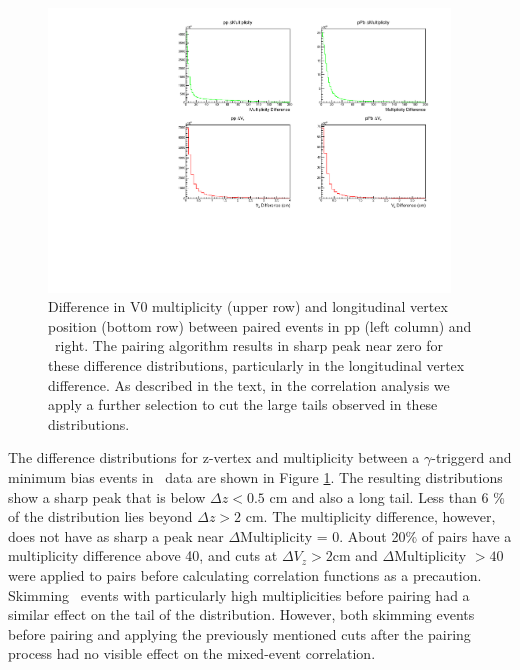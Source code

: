 \begin{figure}[h]
\center
\includegraphics[width=0.95\textwidth]{Data_Analysis/EventMixing/pPb_Differences.pdf}
\caption{Difference in V0 multiplicity
(upper row) and longitudinal vertex position (bottom row) between paired events in pp (left column) and \pPb~right. The pairing algorithm results in sharp peak near zero for these difference distributions, particularly in the longitudinal vertex difference. As described in the text, in the correlation analysis we apply a further selection to cut the large tails observed in these distributions. }
\label{Difference_distributions}
\end{figure}

The difference distributions for z-vertex and multiplicity between a \(\gamma\)-triggerd and minimum bias events in \pPb~data are shown in Figure \ref{Difference_distributions}. The resulting distributions show a sharp peak that is below {$\Delta z<0.5$ cm} and also a long tail. Less than 6 \% of the distribution lies beyond $\Delta z > 2$ cm. The multiplicity difference, however, does not have as sharp a peak near \(\Delta\)Multiplicity = 0. About 20$\%$ of pairs have a multiplicity difference above 40, and cuts at \(\Delta V_z > 2\)cm and \(\Delta\)Multiplicity \(> 40\) were applied to pairs before calculating correlation functions as a precaution.
 Skimming \pPb~events with particularly high multiplicities before pairing had a similar effect on the tail of the distribution. However, both skimming events before pairing and applying the previously mentioned cuts after the pairing process had no visible effect on the mixed-event correlation.


